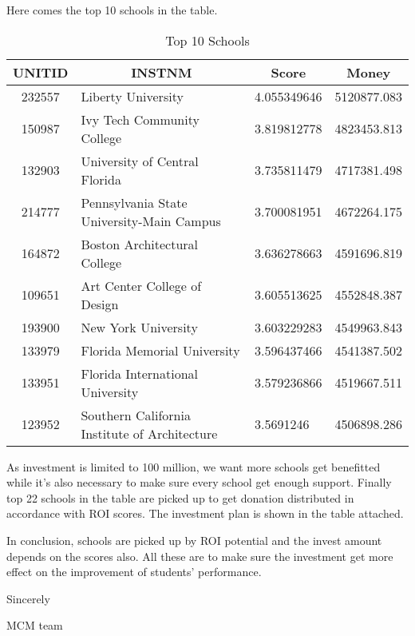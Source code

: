 \begin{appendices}
Here comes the top 10 schools in the table.
\begin{table}[htbp]
  \centering
  \caption{Top 10 Schools}
    \begin{tabular}{cllr}
    \toprule
    \textbf{UNITID} & \multicolumn{1}{c}{\textbf{INSTNM}} & \multicolumn{1}{c}{\textbf{Score}} & \multicolumn{1}{c}{\textbf{Money}} \\
    \midrule
    232557 & Liberty University & 4.055349646 & 5120877.083 \\
    150987 & Ivy Tech Community College & 3.819812778 & 4823453.813 \\
    132903 & University of Central Florida & 3.735811479 & 4717381.498 \\
    214777 & Pennsylvania State University-Main Campus & 3.700081951 & 4672264.175 \\
    164872 & Boston Architectural College & 3.636278663 & 4591696.819 \\
    109651 & Art Center College of Design & 3.605513625 & 4552848.387 \\
    193900 & New York University & 3.603229283 & 4549963.843 \\
    133979 & Florida Memorial University & 3.596437466 & 4541387.502 \\
    133951 & Florida International University & 3.579236866 & 4519667.511 \\
    123952 & Southern California Institute of Architecture & 3.5691246 & 4506898.286 \\
    \bottomrule
    \end{tabular}%
  \label{tab:top10}%
\end{table}%

As investment is limited to 100 million, we want more schools get benefitted while it's also necessary to make sure every school get enough support. Finally top 22 schools in the table are picked up to get donation distributed in accordance with ROI scores. The investment plan is shown in the table attached.

In conclusion, schools are picked up by ROI potential and the invest amount depends on the scores also. All these are to make sure the investment get more effect on the improvement of students' performance.
  \begin{flushright}
  Sincerely

  MCM team
  \end{flushright}

%
\newpage

\end{appendices}
